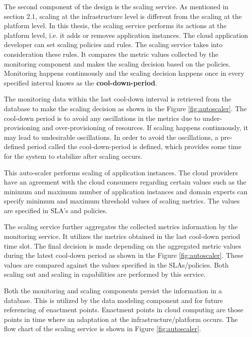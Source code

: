 \documentclass[article,type=msc,colorback,12pt,accentcolor=tud8b,table]{tudthesis}
\begin{document}
		The second component of the design is the scaling service. As mentioned in section 2.1, scaling at the infrastructure level is different from the scaling at the platform level. In this thesis, the scaling service performs its actions at the platform level, i.e. it adds or removes application instances. The cloud application developer can set scaling policies and rules. The scaling service takes into consideration these rules. It compares the metric values collected by the monitoring component and makes the scaling decision based on the policies. Monitoring happens continuously and the scaling decision happens once in every specified interval knows as the \textbf{cool-down-period}. 
		
	\par The monitoring data within the last cool-down interval is retrieved from the database to make the scaling decision as shown in the Figure \ref{fig:autoscaler}. The cool-down period is to avoid any oscillations in the metrics due to under-provisioning and over-provisioning of resources. If scaling happens continuously, it may lead to undesirable oscillations. In order to avoid the oscillations, a pre-defined period called the cool-down-period is defined, which provides some time for the system to stabilize after scaling occurs. 	
		
 	This auto-scaler performs scaling of application instances. The cloud providers have an agreement with the cloud consumers regarding certain values such as the minimum and maximum number of application instances and domain experts can specify minimum and maximum threshold values of scaling metrics. The values are specified in SLA's and policies.
 
 	The scaling service further aggregates the collected metrics information by the monitoring service. It utilizes the metrics obtained in the last cool-down period time slot. The final decision is made depending on the aggregated metric values during the latest cool-down period as shown in the Figure \ref{fig:autoscaler}. These values are compared against the values specified in the SLAs/policies. Both scaling out and scaling in capabilities are performed by this service.
 	 	    
	 Both the monitoring and scaling components persist the information in a database. This is utilized by the data modeling component and for future referencing of enactment points. Enactment points in cloud computing are those points in time where an adaptation at the infrastructure/platform occurs. The flow chart of the scaling service is shown in Figure \ref{fig:autoscaler}.
	 
\end{document}
